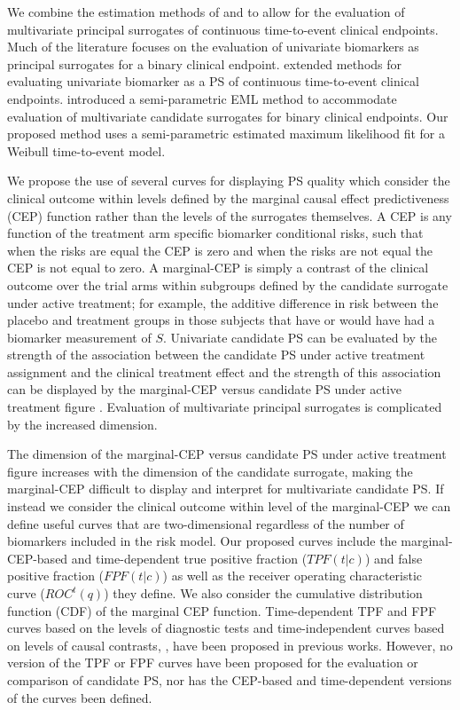 \documentclass[times, doublespace]{simauth}
\begin{document}
We combine the estimation methods of \citet{Gabriel13} and  \citet{Huang11}  to allow for the evaluation of multivariate principal surrogates of continuous time-to-event clinical endpoints. Much of the literature focuses on the evaluation of univariate biomarkers as principal surrogates for a binary clinical endpoint. \citet{Gabriel13} extended methods for evaluating univariate biomarker as a PS of continuous time-to-event clinical endpoints. \citet{Huang11} introduced a semi-parametric EML method to accommodate evaluation of multivariate candidate surrogates for binary clinical endpoints.  Our proposed method uses a semi-parametric estimated maximum likelihood fit for a Weibull time-to-event model. 

We propose the use of several curves for displaying PS quality which consider the clinical outcome within levels defined by the marginal causal effect predictiveness (CEP) function rather than the levels of the surrogates themselves. A CEP is any function of the treatment arm specific biomarker conditional risks, such that when the risks are equal the CEP is zero and when the risks are not equal the CEP is not equal to zero. A marginal-CEP is simply a contrast of the clinical outcome over the trial arms within subgroups defined by the candidate surrogate under active treatment; for example, the additive difference in risk between the placebo and treatment groups in those subjects that have or would have had a biomarker measurement of $S$. Univariate candidate PS can be evaluated by the strength of the association between the candidate PS under active treatment assignment and the clinical treatment effect and the strength of this association can be displayed by the marginal-CEP versus candidate PS under active treatment figure \citep{Gilbert08}. Evaluation of multivariate principal surrogates is complicated by the increased dimension.  


The dimension of the marginal-CEP versus candidate PS under active treatment figure increases with the dimension of the candidate surrogate, making the marginal-CEP difficult to display and interpret for multivariate candidate PS. If instead we consider the clinical outcome within level of the marginal-CEP we can define useful curves that are two-dimensional regardless of the number of biomarkers included in the risk model. Our proposed curves include the marginal-CEP-based and time-dependent true positive fraction ($TPF(t|c)$) and false positive fraction ($FPF(t|c)$) as well as the receiver operating characteristic curve ($ROC^{t}(q)$) they define. We also consider the cumulative distribution function (CDF) of the marginal CEP function. Time-dependent TPF and FPF curves based on the levels of diagnostic tests and time-independent curves based on levels of causal contrasts, \citep{Huang12b}, have been proposed in previous works. However, no version of the TPF or FPF curves have been proposed for the evaluation or comparison of candidate PS, nor has the CEP-based and time-dependent versions of the curves been defined. 
\end{document}
